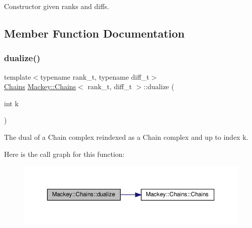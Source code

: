 Constructor given ranks and diffs. 



\subsection{Member Function Documentation}
\mbox{\label{classMackey_1_1Chains_a9aa778859604adb53977935b03caa5a5}} 
\subsubsection{\texorpdfstring{dualize()}{dualize()}\hspace{0.1cm}{\footnotesize\ttfamily [1/2]}}
{\footnotesize\ttfamily template$<$typename rank\+\_\+t, typename diff\+\_\+t$>$ \\
\hyperlink{classMackey_1_1Chains}{Chains} \hyperlink{classMackey_1_1Chains}{Mackey\+::\+Chains}$<$ rank\+\_\+t, diff\+\_\+t $>$\+::dualize (\begin{DoxyParamCaption}\item[{int}]{k }\end{DoxyParamCaption})\hspace{0.3cm}{\ttfamily [inline]}}



The dual of a Chain complex reindexed as a Chain complex and up to index k. 

Here is the call graph for this function\+:\nopagebreak
\begin{figure}[H]
\begin{center}
\leavevmode
\includegraphics[width=350pt]{classMackey_1_1Chains_a9aa778859604adb53977935b03caa5a5_cgraph}
\end{center}
\end{figure}
\mbox{\label{classMackey_1_1Chains_a199843c84295e6755a41cf80ed0db7fd}} 
